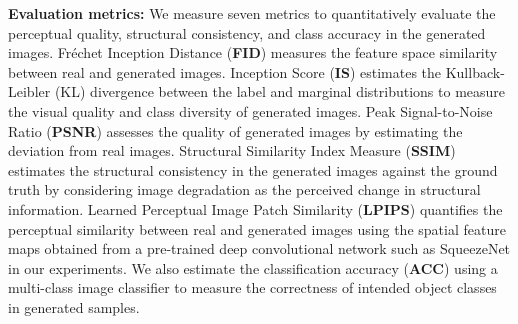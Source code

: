 \vspace{-2.5em}

\begin{table}[h]
\centering
\caption{Quantitative analysis of the proposed method on Flickr20 dataset.}
\label{tab:comparison_flickr20}
\end{table}

\vspace{-0.5em}

\noindent
\textbf{Evaluation metrics:} We measure seven metrics to quantitatively evaluate the perceptual quality, structural consistency, and class accuracy in the generated images. Fr\'{e}chet Inception Distance (\textbf{FID}) measures the feature space similarity between real and generated images. Inception Score (\textbf{IS}) estimates the Kullback-Leibler (KL) divergence between the label and marginal distributions to measure the visual quality and class diversity of generated images. Peak Signal-to-Noise Ratio (\textbf{PSNR}) assesses the quality of generated images by estimating the deviation from real images. Structural Similarity Index Measure (\textbf{SSIM}) estimates the structural consistency in the generated images against the ground truth by considering image degradation as the perceived change in structural information. Learned Perceptual Image Patch Similarity (\textbf{LPIPS}) quantifies the perceptual similarity between real and generated images using the spatial feature maps obtained from a pre-trained deep convolutional network such as SqueezeNet in our experiments. We also estimate the classification accuracy (\textbf{ACC}) using a multi-class image classifier to measure the correctness of intended object classes in generated samples.

